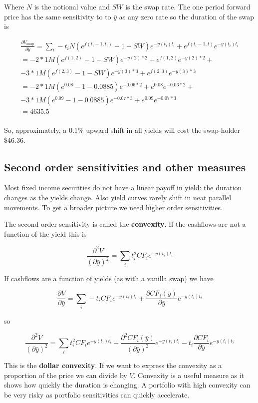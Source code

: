 Where $N$ is the notional value and $SW$ is the swap rate. The one period forward price has the same sensitivity to to $\bar{y}$ as any zero rate so the duration of the swap is

\begin{eqnarray*}
 \frac{\partial V_{\textrm{swap}}}{\partial \bar{y}}  = \sum_i -t_i N(e^{f(t_i-1,t_i)}-1-SW) e^{-y(t_i)t_i} + e^{f(t_i-1,t)} e^{-y(t_i)t_i} \\
 = -2*1M (e^{f(1,2)}-1-SW )e^{-y(2)*2} +  e^{f(1,2)}e^{-y(2)*2}  +\\
  -3*1M (e^{f(2,3)}-1-SW )e^{-y(3)*3} +  e^{f(2,3)}e^{-y(3)*3} \\ 
 = -2*1M (e^{0.08}-1-0.0885 )e^{-0.06*2} +  e^{0.08}e^{-0.06*2}  +\\
  -3*1M (e^{0.09}-1-0.0885 )e^{-0.07*3} +  e^{0.09}e^{-0.07*3} \\ 
 = 4635.5\\
\end{eqnarray*}

So, approximately, a 0.1\% upward shift in all yields will cost the swap-holder \$46.36. 

\subsection{Second order sensitivities and other measures}
Most fixed income securities do not have a linear payoff in yield: the duration changes as the yields change. Also yield curves rarely shift in neat parallel movements. To get a broader picture we need higher order sensitivities.

The second order sensitivity is called the \textbf{convexity}. If the cashflows are not a function of the yield this is

\[ \frac{\partial^2 V}{(\partial \bar{y})^2} =  \sum_i t_i^2 CF_i e^{-y(t_i)t_i}  \] 
 
 If cashflows are a function of yields (as with a vanilla swap) we have
 
 \[\frac{\partial V}{\partial \bar{y}}  =  \sum_i -t_i CF_i e^{-y(t_i)t_i} + \frac{\partial CF_i(\bar{y})}{\partial \bar{y}} e^{-y(t_i)t_i} \]
 
 so
 
  \[\frac{\partial^2 V}{(\partial \bar{y})^2}  =  \sum_i t_i^2 CF_i e^{-y(t_i)t_i} + \frac{\partial^2 CF_i(\bar{y})}{(\partial \bar{y})^2} e^{-y(t_i)t_i} - t_i\frac{\partial CF_i}{\partial \bar{y}}e^{-y(t_i)t_i} \]


This is the \textbf{dollar convexity}. If we want to express the convexity as a proportion of the price we can divide by $V$. Convexity is a useful measure as it shows how quickly the duration is changing. A portfolio with high convexity can be very risky as portfolio sensitivities can quickly accelerate.


